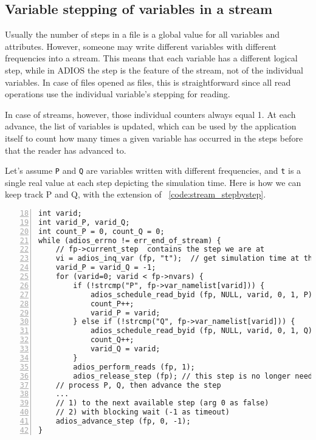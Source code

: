 

\label {label_section_variable_stepping}
\subsection {Variable stepping of variables in a stream}
Usually the number of steps in a file is a global value for all variables and attributes. However, someone may write different variables with different frequencies into a stream. This means that each variable has a different logical step, while in ADIOS the step is the feature of the stream, not of the individual variables. In case of files opened as files, this is straightforward since all read operations use the individual variable's stepping for reading. 

In case of streams, however, those individual counters always equal 1. At each advance, the list of variables is updated, which can be used by the application itself to count how many times a given variable has occurred in the steps before that the reader has advanced to. 

Let's assume \verb+P+ and \verb+Q+ are variables written with different frequencies, and \verb+t+ is a single real value at each step depicting the simulation time. Here is how we can keep track P and Q, with the extension of  \lstlistingname~\ref{code:stream_stepbystep}.

\begin{lstlisting}[numbers=left, numberstyle=\color{gray}, stepnumber=2,firstnumber=18,
                             caption={Processing varying set of variables in a stream},  label=code:stream_variable_stepping]
int varid;
int varid_P, varid_Q;
int count_P = 0, count_Q = 0;
while (adios_errno != err_end_of_stream) {
    // fp->current_step  contains the step we are at
    vi = adios_inq_var (fp, "t");  // get simulation time at this step
    varid_P = varid_Q = -1; 
    for (varid=0; varid < fp->nvars) {
        if (!strcmp("P", fp->var_namelist[varid])) {
            adios_schedule_read_byid (fp, NULL, varid, 0, 1, P);
            count_P++;
            varid_P = varid;
        } else if (!strcmp("Q", fp->var_namelist[varid])) {
            adios_schedule_read_byid (fp, NULL, varid, 0, 1, Q);
            count_Q++;
            varid_Q = varid;
        }
        adios_perform_reads (fp, 1);   
        adios_release_step (fp); // this step is no longer needed
    // process P, Q, then advance the step
    ...
    // 1) to the next available step (arg 0 as false) 
    // 2) with blocking wait (-1 as timeout)
    adios_advance_step (fp, 0, -1);
}
\end{lstlisting}

